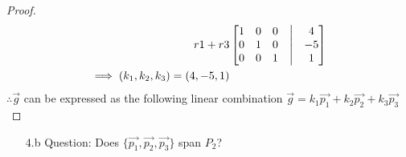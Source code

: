 \documentclass[12pt]{article}
\begin{document}
\begin{proof}
\begin{align*}
                r1 + r3
                 &
                \begin{bmatrix}
                        1 & 0 & 0 & \bigm| & 4  \\
                        0 & 1 & 0 & \bigm| & -5 \\
                        0 & 0 & 1 & \bigm| & 1  \\
                \end{bmatrix} \\
                \implies (k_{1}, k_{2}, k_{3}) = (4, -5, 1)
        \end{align*}
        $\therefore \vec{g}$ can be expressed as the following linear combination $\vec{g} = k_{1}\vec{p_{1}} + k_{2}\vec{p_{2}} + k_{3}\vec{p_{3}}$
\end{proof}
\pagebreak
\begin{enumerate}
        \item[4.b]Question: Does $\{\vec{p_1},\vec{p_2},\vec{p_3}\}$ span $P_2$?
\end{enumerate}
\end{document}

